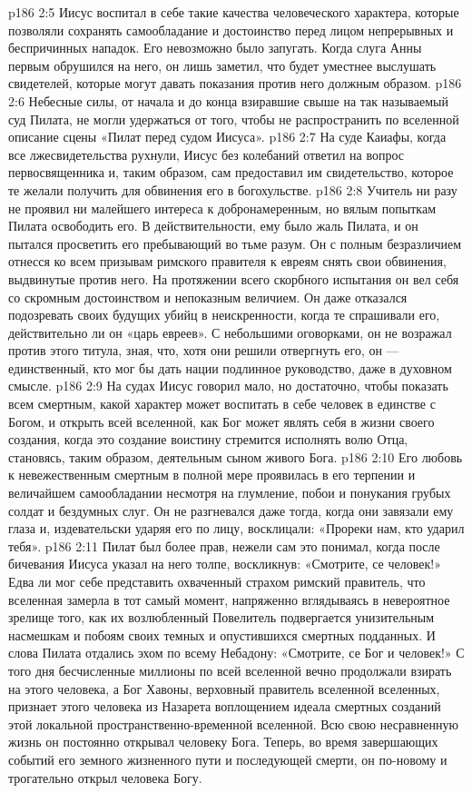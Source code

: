 \vs p186 2:5 \pc Иисус воспитал в себе такие качества человеческого характера, которые позволяли сохранять самообладание и достоинство перед лицом непрерывных и беспричинных нападок. Его невозможно было запугать. Когда слуга Анны первым обрушился на него, он лишь заметил, что будет уместнее выслушать свидетелей, которые могут давать показания против него должным образом.
\vs p186 2:6 Небесные силы, от начала и до конца взиравшие свыше на так называемый суд Пилата, не могли удержаться от того, чтобы не распространить по вселенной описание сцены «Пилат перед судом Иисуса».
\vs p186 2:7 На суде Каиафы, когда все лжесвидетельства рухнули, Иисус без колебаний ответил на вопрос первосвященника и, таким образом, сам предоставил им свидетельство, которое те желали получить для обвинения его в богохульстве.
\vs p186 2:8 Учитель ни разу не проявил ни малейшего интереса к добронамеренным, но вялым попыткам Пилата освободить его. В действительности, ему было жаль Пилата, и он пытался просветить его пребывающий во тьме разум. Он с полным безразличием отнесся ко всем призывам римского правителя к евреям снять свои обвинения, выдвинутые против него. На протяжении всего скорбного испытания он вел себя со скромным достоинством и непоказным величием. Он даже отказался подозревать своих будущих убийц в неискренности, когда те спрашивали его, действительно ли он «царь евреев». С небольшими оговорками, он не возражал против этого титула, зная, что, хотя они решили отвергнуть его, он --- единственный, кто мог бы дать нации подлинное руководство, даже в духовном смысле.
\vs p186 2:9 На судах Иисус говорил мало, но достаточно, чтобы показать всем смертным, какой характер может воспитать в себе человек в единстве с Богом, и открыть всей вселенной, как Бог может являть себя в жизни своего создания, когда это создание воистину стремится исполнять волю Отца, становясь, таким образом, деятельным сыном живого Бога.
\vs p186 2:10 Его любовь к невежественным смертным в полной мере проявилась в его терпении и величайшем самообладании несмотря на глумление, побои и понукания грубых солдат и бездумных слуг. Он не разгневался даже тогда, когда они завязали ему глаза и, издевательски ударяя его по лицу, восклицали: «Прореки нам, кто ударил тебя».
\vs p186 2:11 Пилат был более прав, нежели сам это понимал, когда после бичевания Иисуса указал на него толпе, воскликнув: «Смотрите, се человек!» Едва ли мог себе представить охваченный страхом римский правитель, что вселенная замерла в тот самый момент, напряженно вглядываясь в невероятное зрелище того, как их возлюбленный Повелитель подвергается унизительным насмешкам и побоям своих темных и опустившихся смертных подданных. И слова Пилата отдались эхом по всему Небадону: «Смотрите, се Бог и человек!» С того дня бесчисленные миллионы по всей вселенной вечно продолжали взирать на этого человека, а Бог Хавоны, верховный правитель вселенной вселенных, признает этого человека из Назарета воплощением идеала смертных созданий этой локальной пространственно\hyp{}временной вселенной. Всю свою несравненную жизнь он постоянно открывал человеку Бога. Теперь, во время завершающих событий его земного жизненного пути и последующей смерти, он по\hyp{}новому и трогательно открыл человека Богу.
